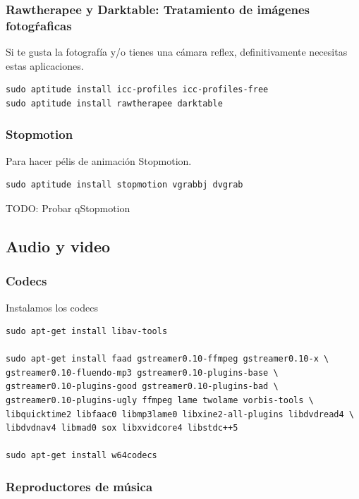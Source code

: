 \documentclass[12pt,spanish,]{scrartcl}
\begin{document}
\subsubsection{Rawtherapee y Darktable: Tratamiento de imágenes
fotogŕaficas}\label{rawtherapee-y-darktable-tratamiento-de-imuxe1genes-fotogux155aficas}

Si te gusta la fotografía y/o tienes una cámara reflex, definitivamente
necesitas estas aplicaciones.

\begin{verbatim}
sudo aptitude install icc-profiles icc-profiles-free
sudo aptitude install rawtherapee darktable
\end{verbatim}

\subsubsection{Stopmotion}\label{stopmotion}

Para hacer pélis de animación Stopmotion.

\begin{verbatim}
sudo aptitude install stopmotion vgrabbj dvgrab
\end{verbatim}

TODO: Probar qStopmotion

\subsection{Audio y video}\label{audio-y-video}

\subsubsection{Codecs}\label{codecs}

Instalamos los codecs

\begin{verbatim}
sudo apt-get install libav-tools

sudo apt-get install faad gstreamer0.10-ffmpeg gstreamer0.10-x \
gstreamer0.10-fluendo-mp3 gstreamer0.10-plugins-base \
gstreamer0.10-plugins-good gstreamer0.10-plugins-bad \
gstreamer0.10-plugins-ugly ffmpeg lame twolame vorbis-tools \
libquicktime2 libfaac0 libmp3lame0 libxine2-all-plugins libdvdread4 \
libdvdnav4 libmad0 sox libxvidcore4 libstdc++5

sudo apt-get install w64codecs
\end{verbatim}

\subsubsection{Reproductores de
música}\label{reproductores-de-muxfasica}
\end{document}
